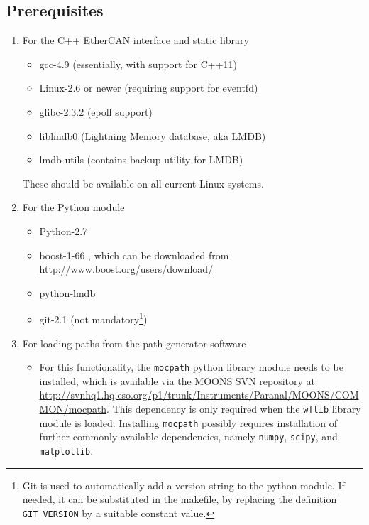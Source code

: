 \documentclass[11pt,a4paper]{scrartcl}
\begin{document}
\subsection{Prerequisites}

\begin{enumerate}
  \item For the C++ EtherCAN interface and static library

    
\begin{itemize}
\item gcc-4.9 (essentially, with support for C++11)
\item Linux-2.6 or newer (requiring support for eventfd)
\item glibc-2.3.2 (epoll support)
\item liblmdb0 (Lightning Memory database, aka LMDB)
\item lmdb-utils (contains backup utility for LMDB)
\end{itemize}

These should be available on all current Linux systems.

\item For the Python module

\begin{itemize}
\item Python-2.7
\item boost-1-66 , which can be downloaded from \url{http://www.boost.org/users/download/}
\item python-lmdb
\item git-2.1 (not mandatory\footnote{Git is used to automatically add a version
  string to the python module. If needed, it can be substituted in the
  makefile, by replacing the definition \texttt{GIT\_VERSION} by a
  suitable constant value.})
\end{itemize}


\item For loading paths from the path generator software
\begin{itemize}
\item For this functionality, the \texttt{mocpath} python library
  module needs to be installed, which is available via the MOONS SVN
  repository at
  \url{http://svnhq1.hq.eso.org/p1/trunk/Instruments/Paranal/MOONS/COMMON/mocpath}.
  This dependency is only required when the \texttt{wflib} library
  module is loaded. Installing \texttt{mocpath} possibly requires
  installation of further commonly available dependencies, namely
  \texttt{numpy}, \texttt{scipy}, and \texttt{matplotlib}.
\end{itemize}
\end{enumerate}
\end{document}
